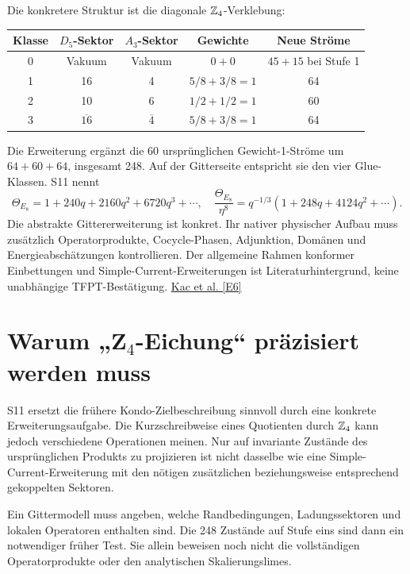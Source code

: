 Die konkretere Struktur ist die diagonale $\mathbb Z_4$-Verklebung:
\begin{center}
\begin{tabular}{ccccc}
\toprule Klasse&$D_5$-Sektor&$A_3$-Sektor&Gewichte&Neue Ströme\\\midrule
0&Vakuum&Vakuum&$0+0$&$45+15$ bei Stufe 1\\
1&16&4&$5/8+3/8=1$&64\\
2&10&6&$1/2+1/2=1$&60\\
3&$\overline{16}$&$\overline4$&$5/8+3/8=1$&64\\\bottomrule
\end{tabular}
\end{center}
Die Erweiterung ergänzt die 60 ursprünglichen Gewicht-1-Ströme um $64+60+64$, insgesamt 248. Auf der Gitterseite entspricht sie den vier Glue-Klassen. S11 nennt
\begin{equation}
\Theta_{E_8}=1+240q+2160q^2+6720q^3+\cdots,
\quad\frac{\Theta_{E_8}}{\eta^8}=q^{-1/3}(1+248q+4124q^2+\cdots).
\end{equation}
Die abstrakte Gittererweiterung ist konkret. Ihr nativer physischer Aufbau muss zusätzlich Operatorprodukte, Cocycle-Phasen, Adjunktion, Domänen und Energieabschätzungen kontrollieren. Der allgemeine Rahmen konformer Einbettungen und Simple-Current-Erweiterungen ist Literaturhintergrund, keine unabhängige TFPT-Bestätigung. \href{https://arxiv.org/abs/1210.6602}{Kac et al. [E6]}

\section{Warum „Z\texorpdfstring{$_4$}{4}-Eichung“ präzisiert werden muss}
S11 ersetzt die frühere Kondo-Zielbeschreibung sinnvoll durch eine konkrete Erweiterungsaufgabe. Die Kurzschreibweise eines Quotienten durch $\mathbb Z_4$ kann jedoch verschiedene Operationen meinen. Nur auf invariante Zustände des ursprünglichen Produkts zu projizieren ist nicht dasselbe wie eine Simple-Current-Erweiterung mit den nötigen zusätzlichen beziehungsweise entsprechend gekoppelten Sektoren.

Ein Gittermodell muss angeben, welche Randbedingungen, Ladungssektoren und lokalen Operatoren enthalten sind. Die 248 Zustände auf Stufe eins sind dann ein notwendiger früher Test. Sie allein beweisen noch nicht die vollständigen Operatorprodukte oder den analytischen Skalierungslimes.

